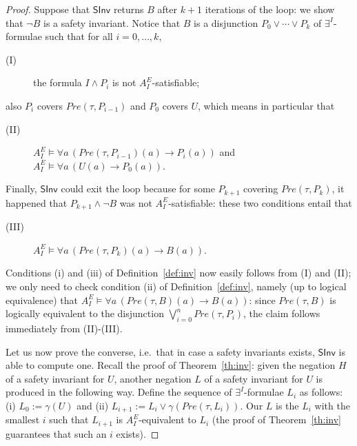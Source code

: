 \documentclass{LMCS}
\theoremstyle{plain}\newtheorem{assumption}[thm]{Assumption}
\theoremstyle{plain}\newtheorem{proposition}[thm]{Proposition}
\theoremstyle{plain}\newtheorem{property}[thm]{Property}
\theoremstyle{plain}\newtheorem{example}[thm]{Example}
\theoremstyle{plain}\newtheorem{claim}[thm]{Claim}
\theoremstyle{plain}\newtheorem{lemma}[thm]{Lemma}
\begin{document}
\begin{proof}
  Suppose that $\mathsf{SInv}$ returns $B$ after $k+1$ iterations of
  the loop: we show that $\neg B$ is a safety invariant.  Notice that
  $B$ is a disjunction $P_0\vee\cdots\vee P_k$ of $\exists^I$-formulae
  such that for all $i=0, \dots, k$,
  \begin{description}
  \item[{\rm (I)}] the formula $I\wedge P_i$ is not
    $A^E_I$-satisfiable;
  \end{description}
  also $P_{i}$ covers $Pre(\tau, P_{i-1})$ and $P_0$ covers $U$, which
  means in particular that
  \begin{description}
  \item[{\rm (II)}] $A^E_I\models \forall a\,(Pre(\tau,P_{i-1})(a)\to
    P_{i}(a))$ and $A^E_I\models \forall a\,(U(a)\to P_{0}(a))$.
  \end{description}
  Finally, $\mathsf{SInv}$ could exit the loop because for some
  $P_{k+1}$ covering $Pre(\tau, P_k)$, it happened that $P_{k+1}\wedge
  \neg B$ was not $A^E_I$-satisfiable: these two conditions entail
  that
  \begin{description}
  \item[{\rm (III)}] $A^E_I\models \forall a\,(Pre(\tau, P_k)(a)\to
    B(a))$.
  \end{description}
  Conditions (i) and (iii) of Definition~\ref{def:inv} now easily
  follows from (I) and (II); we only need to check condition (ii) of
  Definition~\ref{def:inv}, namely (up to logical equivalence) that
  $A^E_I\models \forall a \,(Pre(\tau, B)(a)\to B(a))$: since
  $Pre(\tau, B)$ is logically equivalent to the disjunction
  $\bigvee_{i=0}^n Pre(\tau, P_i)$, the claim follows immediately from
  (II)-(III).

  Let us now prove the converse, i.e.\ that in case a safety
  invariants exists, $\mathsf{SInv}$ is able to compute one.  Recall
  the proof of Theorem~\ref{th:inv}: given the negation $H$ of a
  safety invariant for $U$, another negation $L$ of a safety invariant
  for $U$ is produced in the following way. Define the sequence of
  $\exists^I$-formulae $L_i$ as follows: (i) $L_0:=\gamma(U)$ and (ii)
  $L_{i+1}:= L_i\vee \gamma(Pre(\tau, L_i))$. Our $L$ is the $L_i$
  with the smallest $i$ such that $L_{i+1}$ is $A^E_I$-equivalent to
  $L_i$ (the proof of Theorem~\ref{th:inv} guarantees that such an $i$
  exists).


\end{proof}
\end{document}
